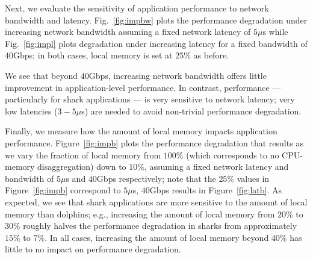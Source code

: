 Next, we evaluate the sensitivity of application performance to network bandwidth and latency. Fig.~\ref{fig:impbw} plots the performance degradation under increasing network bandwidth assuming a fixed network latency of $5\mu$s while Fig.~\ref{fig:impl} plots degradation under increasing latency for a fixed bandwidth of $40$Gbps; in both cases, local memory is set at $25\%$ as before.

We see that beyond $40$Gbps, increasing network bandwidth offers little improvement in application-level performance. 
%
%
In contrast, performance --- particularly for shark applications --- is very sensitive to network latency; very low latencies ($3-5\mu$s) are needed to avoid non-trivial performance degradation.

Finally, we measure how the amount of local memory impacts application performance.
Figure~\ref{fig:impb} plots the performance degradation that results as we vary the fraction of local memory from $100\%$ (which corresponds to no CPU-memory disaggregation) down to $10\%$, assuming a fixed network latency and bandwidth of $5\mu$s and $40$Gbps respectively; note that the $25\%$ values in Figure~\ref{fig:impb} correspond to $5\mu$s, $40$Gbps results in Figure~\ref{fig:latb}. 
As expected, we see that shark applications are more sensitive to the amount of local memory than dolphins; e.g., increasing the amount of local memory from $20\%$ to $30\%$ roughly halves the performance degradation in sharks from approximately $15\%$ to $7\%$.
In all cases, increasing the amount of local memory beyond $40\%$ has little to no impact on performance degradation.

